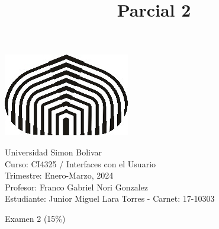 \documentclass[a4paper,12pt]{article}
\title{Parcial 2}
\begin{document}
\begin{center}
\par \includegraphics[scale=1]{USB} \par
Universidad Simon Bolivar \\ Curso: CI4325 / Interfaces con el Usuario \\ Trimestre: Enero-Marzo, 2024 \\ Profesor: Franco Gabriel Nori Gonzalez \\ Estudiante: Junior Miguel Lara Torres - Carnet: 17-10303 \\
\end{center}

\begin{center}
Examen 2 (15\%)
\end{center}
\end{document}
